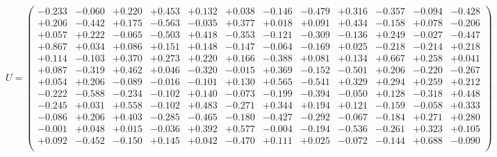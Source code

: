 \documentclass[9pt]{article}
\theoremstyle{plain}
\theoremstyle{definition}
\theoremstyle{remark}
\numberwithin{equation}{section}
\begin{document}
$U = \left(
\begin{array}{
cccccccccccc}
-0.233 & -0.060 & +0.220 & +0.453 & +0.132 & +0.038 & -0.146 & -0.479 & +0.316 & -0.357 & -0.094 & -0.428 \\
+0.206 & -0.442 & +0.175 & -0.563 & -0.035 & +0.377 & +0.018 & +0.091 & +0.434 & -0.158 & +0.078 & -0.206 \\
+0.057 & +0.222 & -0.065 & -0.503 & +0.418 & -0.353 & -0.121 & -0.309 & -0.136 & +0.249 & -0.027 & -0.447 \\
+0.867 & +0.034 & +0.086 & +0.151 & +0.148 & -0.147 & -0.064 & -0.169 & +0.025 & -0.218 & -0.214 & +0.218 \\
+0.114 & -0.103 & +0.370 & +0.273 & +0.220 & +0.166 & -0.388 & +0.081 & +0.134 & +0.667 & +0.258 & +0.041 \\
+0.087 & -0.319 & +0.462 & +0.046 & -0.320 & -0.015 & +0.369 & -0.152 & -0.501 & +0.206 & -0.220 & -0.267 \\
+0.054 & +0.206 & -0.089 & -0.016 & -0.101 & +0.130 & +0.565 & -0.541 & +0.329 & +0.294 & +0.259 & +0.212 \\
-0.222 & -0.588 & -0.234 & -0.102 & +0.140 & -0.073 & -0.199 & -0.394 & -0.050 & +0.128 & -0.318 & +0.448 \\
-0.245 & +0.031 & +0.558 & -0.102 & +0.483 & -0.271 & +0.344 & +0.194 & +0.121 & -0.159 & -0.058 & +0.333 \\
-0.086 & +0.206 & +0.403 & -0.285 & -0.465 & -0.180 & -0.427 & -0.292 & -0.067 & -0.184 & +0.271 & +0.280 \\
-0.001 & +0.048 & +0.015 & -0.036 & +0.392 & +0.577 & -0.004 & -0.194 & -0.536 & -0.261 & +0.323 & +0.105 \\
+0.092 & -0.452 & -0.150 & +0.145 & +0.042 & -0.470 & +0.111 & +0.025 & -0.072 & -0.144 & +0.688 & -0.090 \\
\end{array}
\right)$ \newline 
\end{document}
